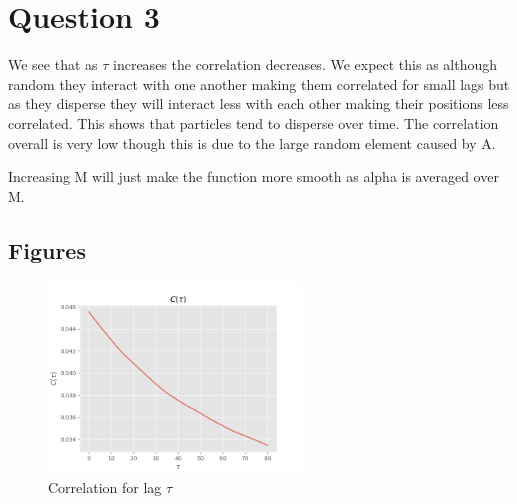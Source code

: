 \documentclass{article}
\begin{document}




\section*{Question 3}
We see that as $\tau$ increases the correlation decreases. We expect this
as although random they interact with one another making them correlated for small lags
but as they disperse they will interact less with each other making their positions less correlated. This shows that particles tend to disperse over time.
The correlation overall is very low though this is due to the large random element caused by A.

Increasing M will just make the function more smooth as alpha is averaged over M. 

\subsection*{Figures}


\begin{figure}[h!]
\centering
\includegraphics[width=0.6\textwidth]{corr.png}
\caption{Correlation for lag $\tau$}
\label{figCorr}
\end{figure}






\end{document}
